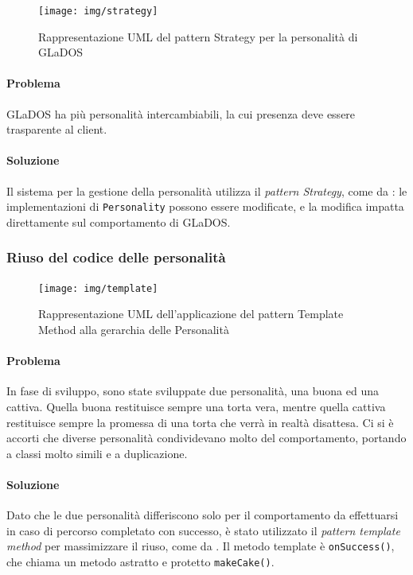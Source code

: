 \documentclass[a4paper,12pt]{report}
\begin{document}
\begin{figure}[H]
    \centering{}
    \texttt{[image: img/strategy]}
    \caption{Rappresentazione UML del pattern Strategy per la personalità di GLaDOS}
    \label{img:strategy}
\end{figure}

\paragraph{Problema} GLaDOS ha più personalità intercambiabili, la cui presenza deve essere trasparente al client.

\paragraph{Soluzione} Il sistema per la gestione della personalità utilizza il \textit{pattern Strategy}, come da
: le implementazioni di \texttt{Personality} possono essere modificate, e la
modifica impatta direttamente sul comportamento di GLaDOS.

\subsubsection{Riuso del codice delle personalità}

\begin{figure}[H]
    \centering{}
    \texttt{[image: img/template]}
    \caption{Rappresentazione UML dell'applicazione del pattern Template Method alla gerarchia delle Personalità}
    \label{img:template}
\end{figure}

\paragraph{Problema} In fase di sviluppo, sono state sviluppate due personalità, una buona ed una cattiva.
Quella buona restituisce sempre una torta vera, mentre quella cattiva restituisce sempre la
promessa di una torta che verrà in realtà disattesa.
Ci si è accorti che diverse personalità condividevano molto del comportamento,
portando a classi molto simili e a duplicazione.

\paragraph{Soluzione} Dato che le due personalità differiscono solo per il comportamento da effettuarsi in caso di percorso completato con successo,
è stato utilizzato il \textit{pattern template method} per massimizzare il riuso, come da .
Il metodo template è \texttt{onSuccess()}, che chiama un metodo astratto e protetto
\texttt{makeCake()}.
\end{document}
